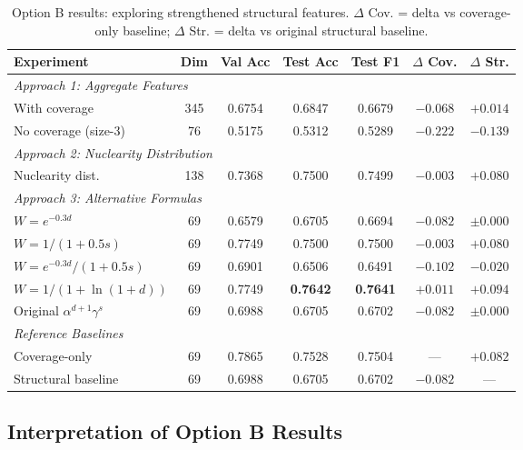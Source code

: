 \documentclass[12pt,a4paper]{article}
\begin{document}
\begin{table}[h]
\centering
\small
\begin{tabular}{lcccccc}
\hline
\textbf{Experiment} & \textbf{Dim} & \textbf{Val Acc} & \textbf{Test Acc} & \textbf{Test F1} & \textbf{$\Delta$ Cov.} & \textbf{$\Delta$ Str.} \\
\hline
\multicolumn{7}{l}{\textit{Approach 1: Aggregate Features}} \\
\quad With coverage & 345 & 0.6754 & 0.6847 & 0.6679 & $-0.068$ & $+0.014$ \\
\quad No coverage (size-3) & 76 & 0.5175 & 0.5312 & 0.5289 & $-0.222$ & $-0.139$ \\
\hline
\multicolumn{7}{l}{\textit{Approach 2: Nuclearity Distribution}} \\
\quad Nuclearity dist. & 138 & 0.7368 & 0.7500 & 0.7499 & $-0.003$ & $+0.080$ \\
\hline
\multicolumn{7}{l}{\textit{Approach 3: Alternative Formulas}} \\
\quad $W = e^{-0.3d}$ & 69 & 0.6579 & 0.6705 & 0.6694 & $-0.082$ & $\pm0.000$ \\
\quad $W = 1/(1+0.5s)$ & 69 & 0.7749 & 0.7500 & 0.7500 & $-0.003$ & $+0.080$ \\
\quad $W = e^{-0.3d}/(1+0.5s)$ & 69 & 0.6901 & 0.6506 & 0.6491 & $-0.102$ & $-0.020$ \\
\quad $W = 1/(1+\ln(1+d))$ & 69 & 0.7749 & \textbf{0.7642} & \textbf{0.7641} & $+0.011$ & $+0.094$ \\
\quad Original $\alpha^{d+1}\gamma^s$ & 69 & 0.6988 & 0.6705 & 0.6702 & $-0.082$ & $\pm0.000$ \\
\hline
\multicolumn{7}{l}{\textit{Reference Baselines}} \\
\quad Coverage-only & 69 & 0.7865 & 0.7528 & 0.7504 & --- & $+0.082$ \\
\quad Structural baseline & 69 & 0.6988 & 0.6705 & 0.6702 & $-0.082$ & --- \\
\hline
\end{tabular}
\caption{Option B results: exploring strengthened structural features. $\Delta$ Cov. = delta vs coverage-only baseline; $\Delta$ Str. = delta vs original structural baseline.}
\label{tab:option_b_results}
\end{table}

\subsection{Interpretation of Option B Results}
\end{document}
